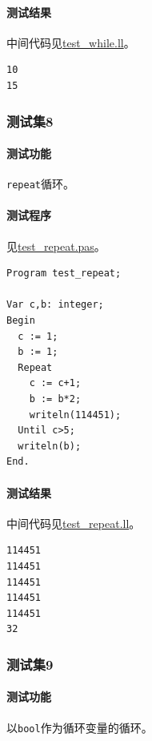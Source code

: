 \documentclass[lang=cn,11pt,a4paper,cite=authornum]{paper}
\begin{document}
\paragraph{测试结果} 中间代码见\href{run:../test/test_while.ll}{test\_while.ll}。

\begin{code}
    \begin{verbatim}
10
15
\end{verbatim}
\end{code}

\subsubsection{测试集8}

\paragraph{测试功能} \texttt{repeat}循环。

\paragraph{测试程序} 见\href{run:../test/test_repeat.pas}{test\_repeat.pas}。

\begin{code}
    \begin{verbatim}
Program test_repeat;

Var c,b: integer;
Begin
  c := 1;
  b := 1;
  Repeat
    c := c+1;
    b := b*2;
    writeln(114451);
  Until c>5;
  writeln(b);
End.
\end{verbatim}
\end{code}

\paragraph{测试结果} 中间代码见\href{run:../test/test_repeat.ll}{test\_repeat.ll}。

\begin{code}
    \begin{verbatim}
114451
114451
114451
114451
114451
32
\end{verbatim}
\end{code}

\subsubsection{测试集9}

\paragraph{测试功能} 以\texttt{bool}作为循环变量的循环。
\end{document}
